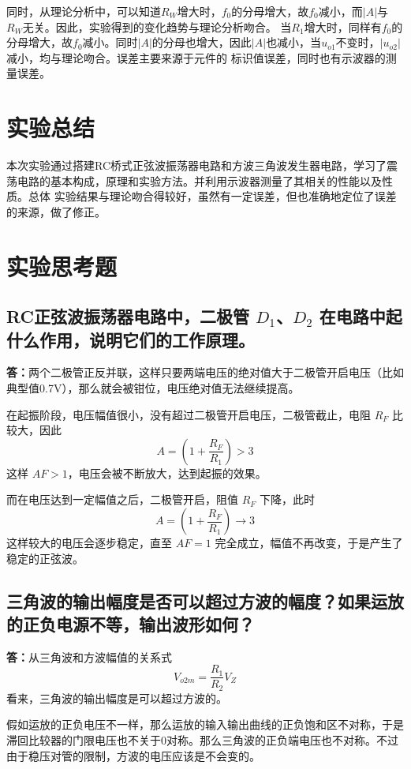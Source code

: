 \documentclass[a4paper,11pt,UTF8]{ctexart}
\newcommand{\p}{\par}
\newcommand{\np}{\par\noindent}
\begin{document}
  同时，从理论分析中，可以知道$R_W$增大时，$f_0$的分母增大，故$f_0$减小，而$|A|$与$R_W$无关。因此，实验得到的变化趋势与理论分析吻合。
  当$R_1$增大时，同样有$f_0$的分母增大，故$f_0$减小。同时$|A|$的分母也增大，因此$|A|$也减小，当$u_{o1}$不变时，$|u_{o2}|$减小，均与理论吻合。误差主要来源于元件的
  标识值误差，同时也有示波器的测量误差。
\section{实验总结}
本次实验通过搭建RC桥式正弦波振荡器电路和方波三角波发生器电路，学习了震荡电路的基本构成，原理和实验方法。并利用示波器测量了其相关的性能以及性质。总体
实验结果与理论吻合得较好，虽然有一定误差，但也准确地定位了误差的来源，做了修正。
\section{实验思考题}
 \subsection{RC正弦波振荡器电路中，二极管 $D_1$、$D_2$ 在电路中起什么作用，说明它们的工作原理。}
 \np \textbf{答：}两个二极管正反并联，这样只要两端电压的绝对值大于二极管开启电压（比如典型值0.7V），那么就会被钳位，电压绝对值无法继续提高。
 \p 在起振阶段，电压幅值很小，没有超过二极管开启电压，二极管截止，电阻 $R_F$ 比较大，因此
 \[ A=\left( 1+\frac{R_F}{R_1} \right)>3 \]
 这样 $AF>1$，电压会被不断放大，达到起振的效果。
 \p 而在电压达到一定幅值之后，二极管开启，阻值 $R_F$ 下降，此时
 \[ A=\left( 1+\frac{R_F}{R_1} \right)\to3 \]
 这样较大的电压会逐步稳定，直至 $AF=1$ 完全成立，幅值不再改变，于是产生了稳定的正弦波。
 \subsection{三角波的输出幅度是否可以超过方波的幅度？如果运放的正负电源不等，输出波形如何？}
 \textbf{答：}从三角波和方波幅值的关系式
 \[ V_{o2m}=\frac{R_1}{R_2}V_Z \]
 看来，三角波的输出幅度是可以超过方波的。
 \p 假如运放的正负电压不一样，那么运放的输入输出曲线的正负饱和区不对称，于是滞回比较器的门限电压也不关于0对称。那么三角波的正负端电压也不对称。不过由于稳压对管的限制，方波的电压应该是不会变的。
\end{document}
